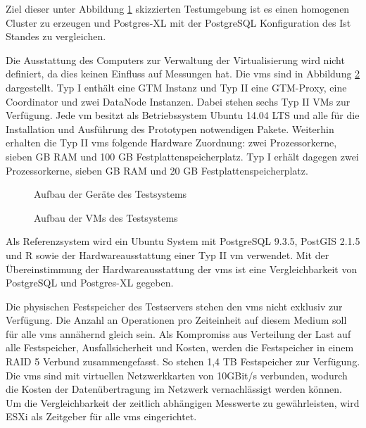 Ziel dieser unter Abbildung \ref{fig:physAufb} skizzierten Testumgebung ist es einen homogenen Cluster zu erzeugen und Postgres-XL mit der PostgreSQL Konfiguration des Ist Standes zu vergleichen.

Die Ausstattung des Computers zur Verwaltung der Virtualisierung wird nicht definiert, da dies keinen Einfluss auf Messungen hat.
Die \Gls{vm}s sind in Abbildung \ref{fig:VMAufb} dargestellt.
Typ I enthält eine GTM Instanz und Typ II eine GTM-Proxy, eine Coordinator und zwei DataNode Instanzen.
Dabei stehen sechs Typ II VMs zur Verfügung.
Jede \Gls{vm} besitzt als Betriebssystem Ubuntu 14.04 LTS und alle für die Installation und Ausführung des Prototypen notwendigen Pakete.
Weiterhin erhalten die Typ II \Gls{vm}s folgende Hardware Zuordnung:
zwei Prozessorkerne, sieben GB RAM und 100 GB Festplattenspeicherplatz.
Typ I erhält dagegen zwei Prozessorkerne, sieben GB RAM und 20 GB Festplattenspeicherplatz.
\begin{figure}[h!]
\centering

\caption[Aufbau der Geräte des Testsystems]{Aufbau der Geräte des Testsystems}
\label{fig:physAufb}
\end{figure}
\begin{figure}[h!]
\centering

\caption[Aufbau der VMs des Testsystems]{Aufbau der VMs des Testsystems}
\label{fig:VMAufb}
\end{figure}

Als Referenzsystem wird ein Ubuntu System mit PostgreSQL 9.3.5, PostGIS 2.1.5 und R sowie der Hardwareausstattung einer Typ II \Gls{vm} verwendet.
Mit der Übereinstimmung der Hardwareausstattung der \Gls{vm}s ist eine Vergleichbarkeit von PostgreSQL und Postgres-XL gegeben.

Die physischen Festspeicher des Testservers stehen den \Gls{vm}s nicht exklusiv zur Verfügung.
Die Anzahl an Operationen pro Zeiteinheit auf diesem Medium soll für alle \Gls{vm}s annähernd gleich sein.
Als Kompromiss aus Verteilung der Last auf alle Festspeicher, Ausfallsicherheit und Kosten, werden die Festspeicher in einem RAID 5 Verbund zusammengefasst.
So stehen 1,4 TB Festspeicher zur Verfügung.
Die \Gls{vm}s sind mit virtuellen Netzwerkkarten von 10GBit/s verbunden, wodurch die Kosten der Datenübertragung im Netzwerk vernachlässigt werden können.
Um die Vergleichbarkeit der zeitlich abhängigen Messwerte zu gewährleisten, wird ESXi als Zeitgeber für alle \Gls{vm}s eingerichtet.

